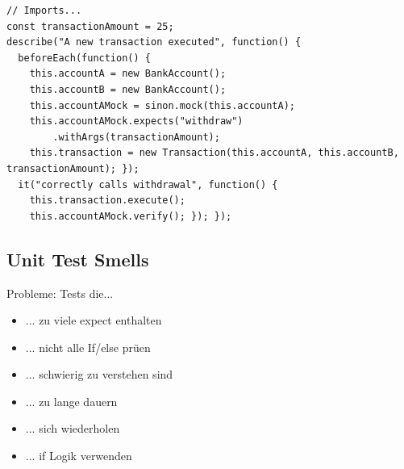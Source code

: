 \begin{lstlisting}
// Imports...
const transactionAmount = 25;
describe("A new transaction executed", function() { 
  beforeEach(function() {
    this.accountA = new BankAccount();
    this.accountB = new BankAccount();
    this.accountAMock = sinon.mock(this.accountA);
    this.accountAMock.expects("withdraw")
        .withArgs(transactionAmount);
    this.transaction = new Transaction(this.accountA, this.accountB, transactionAmount); });
  it("correctly calls withdrawal", function() { 
    this.transaction.execute();
    this.accountAMock.verify(); }); });
    \end{lstlisting}
    

\subsection{Unit Test Smells}
Probleme: Tests die...
\begin{itemize}
    \item ... zu viele expect enthalten
    \item ... nicht alle If/else prüen
    \item ... schwierig zu verstehen sind
    \item ... zu lange dauern
    \item ... sich wiederholen
    \item ... if Logik verwenden
\end{itemize}


\columnbreak
